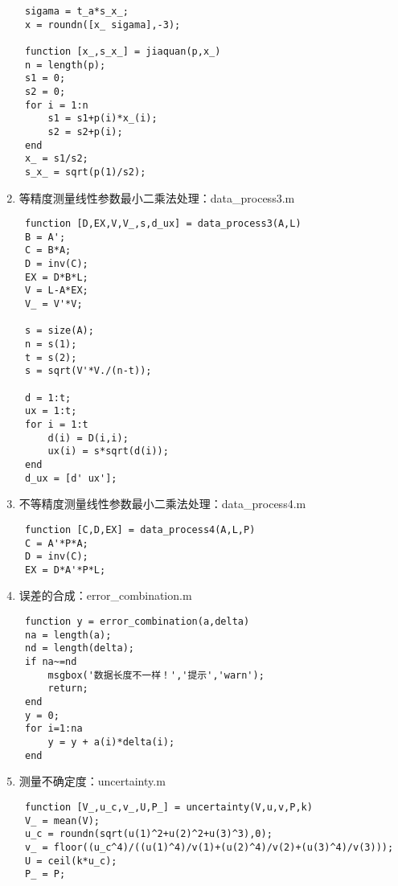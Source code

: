 \begin{enumerate}
\begin{lstlisting}
 sigama = t_a*s_x_;
 x = roundn([x_ sigama],-3);
 
 function [x_,s_x_] = jiaquan(p,x_)
 n = length(p);
 s1 = 0;
 s2 = 0;
 for i = 1:n
     s1 = s1+p(i)*x_(i);
     s2 = s2+p(i);
 end
 x_ = s1/s2;
 s_x_ = sqrt(p(1)/s2);\end{lstlisting}
	\item 等精度测量线性参数最小二乘法处理：data\_process3.m
	\begin{lstlisting}
 function [D,EX,V,V_,s,d_ux] = data_process3(A,L)
 B = A';
 C = B*A;
 D = inv(C);
 EX = D*B*L;
 V = L-A*EX;
 V_ = V'*V;
 
 s = size(A);
 n = s(1);
 t = s(2);
 s = sqrt(V'*V./(n-t));
 
 d = 1:t;
 ux = 1:t;
 for i = 1:t
     d(i) = D(i,i);
     ux(i) = s*sqrt(d(i));
 end
 d_ux = [d' ux'];\end{lstlisting}
	\item 不等精度测量线性参数最小二乘法处理：data\_process4.m
	\begin{lstlisting}
 function [C,D,EX] = data_process4(A,L,P)
 C = A'*P*A;
 D = inv(C);
 EX = D*A'*P*L;\end{lstlisting}
	\item 误差的合成：error\_combination.m
	\begin{lstlisting}
 function y = error_combination(a,delta)
 na = length(a);
 nd = length(delta);
 if na~=nd
     msgbox('数据长度不一样！','提示','warn');
     return;
 end
 y = 0;
 for i=1:na
     y = y + a(i)*delta(i);
 end\end{lstlisting}
	\item 测量不确定度：uncertainty.m
	\begin{lstlisting}
 function [V_,u_c,v_,U,P_] = uncertainty(V,u,v,P,k)
 V_ = mean(V);
 u_c = roundn(sqrt(u(1)^2+u(2)^2+u(3)^3),0);
 v_ = floor((u_c^4)/((u(1)^4)/v(1)+(u(2)^4)/v(2)+(u(3)^4)/v(3)));
 U = ceil(k*u_c);
 P_ = P;\end{lstlisting}
\end{enumerate}